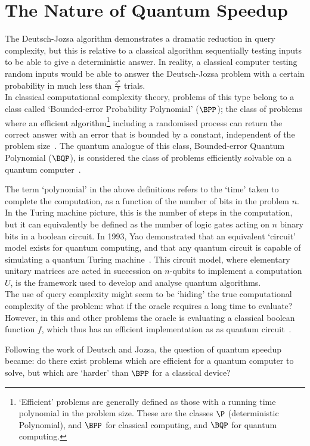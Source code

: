 \documentclass{standalone}
\begin{document}
\section{The Nature of Quantum Speedup}\label{sec:WhatSpeedup}
The Deutsch-Jozsa algorithm demonstrates a dramatic reduction in query complexity, but this is relative to a classical algorithm sequentially testing inputs to be able to give a deterministic answer. In reality, a classical computer testing random inputs would be able to answer the Deutsch-Jozsa problem with a certain probability in much less than $\frac{2^{n}}{2}$ trials. \\
In classical computational complexity theory, problems of this type belong to a class called `Bounded-error Probability Polynomial' ($\BPP$); the class of problems where an efficient algorithm\footnote{`Efficient' problems are generally defined as those with a running time polynomial in the problem size. These are the classes $\P$ (deterministic Polynomial), and $\BPP$ for classical computing, and $\BQP$ for quantum computing.} including a randomised process can return the correct answer with an error that is bounded by a constant, independent of the problem size~\cite{Bennett1997}. The quantum analogue of this class, Bounded-error Quantum Polynomial ($\BQP$), is considered the class of problems efficiently solvable on a quantum computer~\cite{Bernstein1997}.
\par
The term `polynomial' in the above definitions refers to the `time' taken to complete the computation, as a function of the number of bits in the problem $n$. In the Turing machine picture, this is the number of steps in the computation, but it can equivalently be defined as the number of logic gates acting on $n$ binary bits in a boolean circuit. In 1993, Yao demonstrated that an equivalent `circuit' model exists for quantum computing, and that any quantum circuit is capable of simulating a quantum Turing machine~\cite{Yao1993}. This circuit model, where elementary unitary matrices are acted in succession on $n$-qubits to implement a computation $U$, is the framework used to develop and analyse quantum algorithms. \\
The use of query complexity might seem to be `hiding' the true computational complexity of the problem: what if the oracle requires a long time to evaluate? However, in this and other problems the oracle is evaluating a classical boolean function $f$, which thus has an efficient implementation as as quantum circuit~\cite{Bernstein1997}. 
\par
Following the work of Deutsch and Jozsa, the question of quantum speedup became: do there exist problems which are efficient for a quantum computer to solve, but which are `harder' than $\BPP$ for a classical device?
\end{document}

